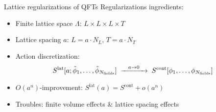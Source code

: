 \documentclass{beamer}
\begin{document}
\begin{frame}{Lattice regularizations of QFTs}
      Regularizations ingredients:
      \begin{itemize}
            \item Finite lattice space $\Lambda$: $L \times L \times L \times T$
            \item Lattice spacing $a$: $L = a\cdot N_L$, $T = a\cdot N_T$
            \item Action discretization:
            \begin{equation*}
                  S^\text{lat}[a;\tilde\phi_1,\dots,\tilde\phi_{N_\text{fields}}] \hspace*{1mm} \xrightarrow{\hspace*{3mm} a \rightarrow 0\hspace*{3mm}} \hspace*{1mm} S^\text{cont}[\phi_1,\dots,\phi_{N_\text{fields}}]
            \end{equation*}
            \item $O(a^n)$-improvement:  $S^\text{lat}(a) = S^\text{cont} + o(a^{n})$
            \item Troubles: finite volume effects \& lattice spacing effects
      \end{itemize}
\end{frame}
\end{document}
